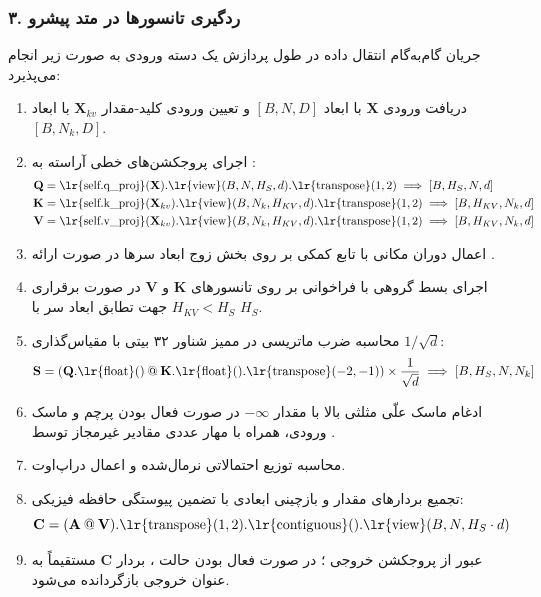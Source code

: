 \subsubsection*{۳. ردگیری تانسورها در متد پیشرو }
جریان گام‌به‌گام انتقال داده در طول پردازش یک دسته ورودی به صورت زیر انجام می‌پذیرد:
\begin{enumerate}
    \item دریافت ورودی $\mathbf{X}$ با ابعاد $[B, N, D]$ و تعیین ورودی کلید-مقدار $\mathbf{X}_{kv}$ با ابعاد $[B, N_k, D]$.
    \item اجرای پروجکشن‌های خطی آراسته به :
    \begin{align}
    \mathbf{Q} &= \text{\lr{self.q\_proj}}(\mathbf{X}).\text{\lr{view}}(B, N, H_S, d).\text{\lr{transpose}}(1, 2) \implies [B, H_S, N, d] \\
    \mathbf{K} &= \text{\lr{self.k\_proj}}(\mathbf{X}_{kv}).\text{\lr{view}}(B, N_k, H_{KV}, d).\text{\lr{transpose}}(1, 2) \implies [B, H_{KV}, N_k, d] \\
    \mathbf{V} &= \text{\lr{self.v\_proj}}(\mathbf{X}_{kv}).\text{\lr{view}}(B, N_k, H_{KV}, d).\text{\lr{transpose}}(1, 2) \implies [B, H_{KV}, N_k, d]
    \end{align}
    \item اعمال دوران مکانی با تابع کمکی  بر روی بخش زوج ابعاد سرها در صورت ارائه .
    \item اجرای بسط گروهی با فراخوانی  بر روی تانسورهای $\mathbf{K}$ و $\mathbf{V}$ در صورت برقراری $H_{KV} < H_S$ جهت تطابق ابعاد سر با $H_S$.
    \item محاسبه ضرب ماتریسی در ممیز شناور ۳۲ بیتی  با مقیاس‌گذاری $1/\sqrt{d}$:
    \begin{equation}
    \mathbf{S} = \left( \mathbf{Q}.\text{\lr{float}}() \mathbin{@} \mathbf{K}.\text{\lr{float}}().\text{\lr{transpose}}(-2, -1) \right) \times \frac{1}{\sqrt{d}} \implies [B, H_S, N, N_k]
    \end{equation}
    \item ادغام ماسک علّی مثلثی بالا  با مقدار $-\infty$ در صورت فعال بودن پرچم  و ماسک ورودی، همراه با مهار عددی مقادیر غیرمجاز توسط .
    \item محاسبه توزیع احتمالاتی نرمال‌شده  و اعمال دراپ‌اوت.
    \item تجمیع بردارهای مقدار و بازچینی ابعادی با تضمین پیوستگی حافظه فیزیکی:
    \begin{equation}
    \mathbf{C} = (\mathbf{A} \mathbin{@} \mathbf{V}).\text{\lr{transpose}}(1, 2).\text{\lr{contiguous}}().\text{\lr{view}}(B, N, H_S \cdot d)
    \end{equation}
    \item عبور از پروجکشن خروجی ؛ در صورت فعال بودن حالت ، بردار $\mathbf{C}$ مستقیماً به عنوان خروجی بازگردانده می‌شود.
\end{enumerate}

